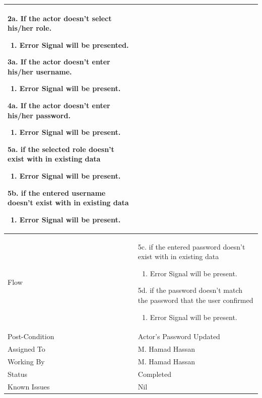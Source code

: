 \documentclass[12pt,a4paper]{article}
\begin{document}
\begin{longtable}{| p{3cm}|p{12cm}|}
2a. If the actor doesn't select his/her role.
 	\begin{enumerate}
		\item Error Signal will be presented.
	\end{enumerate}
3a. If the actor doesn't enter his/her username.
 	\begin{enumerate}
		\item Error Signal will be present.
	\end{enumerate}
4a. If the actor doesn't enter his/her password.
 	\begin{enumerate}
		\item Error Signal will be present.
	\end{enumerate}

5a. if the selected role doesn't exist with in existing data
	\begin{enumerate}
		\item Error Signal will be present.
	\end{enumerate}
5b. if the entered username doesn't exist with in existing data
	\begin{enumerate}
		\item Error Signal will be present.
	\end{enumerate}
\\ \hline
Flow & 5c. if the entered password doesn't exist with in existing data
	\begin{enumerate}
		\item Error Signal will be present.
	\end{enumerate}
	
5d. if the password doesn't match the password that the user confirmed
	\begin{enumerate}
		\item Error Signal will be present.
	\end{enumerate}
	
\\ \hline
Post-Condition & Actor's Password Updated  
\\ \hline
Assigned To &  M. Hamad Hassan
\\ \hline
Working By &    M. Hamad Hassan
\\ \hline
Status & 	Completed	
\\ \hline
Known Issues & Nil
\\\hline

\end{longtable}

\end{document}

